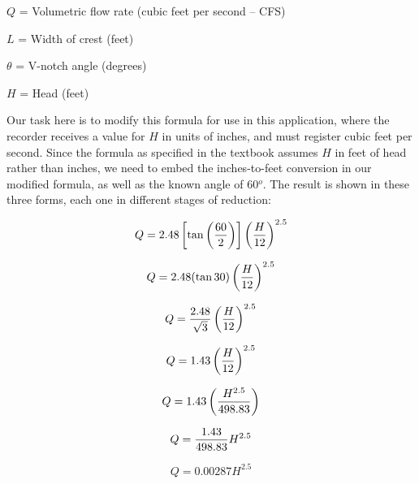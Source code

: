 $Q$ = Volumetric flow rate (cubic feet per second -- CFS)

$L$ = Width of crest (feet)

$\theta$ = V-notch angle (degrees)

$H$ = Head (feet)

\vskip 10pt

Our task here is to modify this formula for use in this application, where the recorder receives a value for $H$ in units of inches, and must register cubic feet per second.  Since the formula as specified in the textbook assumes $H$ in feet of head rather than inches, we need to embed the inches-to-feet conversion in our modified formula, as well as the known angle of 60$^{o}$.  The result is shown in these three forms, each one in different stages of reduction:

$$Q = 2.48 \left[\tan \left(60 \over 2\right)\right] \left({H \over 12} \right)^{2.5}$$

$$Q = 2.48 (\tan 30) \left({H \over 12} \right)^{2.5}$$

$$Q = {2.48 \over \sqrt{3}} \left({H \over 12} \right)^{2.5}$$

$$Q = 1.43 \left({H \over 12} \right)^{2.5}$$

$$Q = 1.43 \left({H^{2.5} \over 498.83} \right)$$

$$Q = {1.43 \over 498.83} H^{2.5}$$

$$Q = 0.00287 H^{2.5}$$



